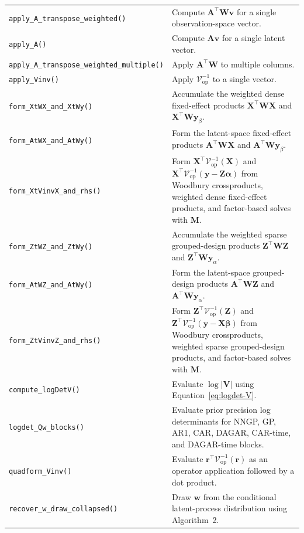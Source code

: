 \documentclass[11pt]{article}
\newcommand{\by}{\bm{y}}
\newcommand{\bw}{\bm{w}}
\newcommand{\balpha}{\bm{\alpha}}
\newcommand{\bbeta}{\bm{\beta}}
\newcommand{\br}{\bm{r}}
\newcommand{\bv}{\bm{v}}
\newcommand{\bA}{\bm{A}}
\newcommand{\bM}{\bm{M}}
\newcommand{\bV}{\bm{V}}
\newcommand{\bW}{\bm{W}}
\newcommand{\bX}{\bm{X}}
\newcommand{\bZ}{\bm{Z}}
\newcommand{\trans}{^\top}
\begin{document}
\begin{longtable}{p{}p{}}
\texttt{apply\_A\_transpose\_weighted()} &
  Compute $\bA\trans \bW\bv$ for a single observation-space vector. \\
\texttt{apply\_A()} & Compute $\bA\bv$ for a single latent vector. \\
\texttt{apply\_A\_transpose\_weighted\_multiple()} & Apply $\bA\trans \bW$ to multiple columns. \\
\texttt{apply\_Vinv()} & Apply $\mathcal{V}^{-1}_{\mathrm{op}}$ to a single vector. \\
\texttt{form\_XtWX\_and\_XtWy()} &
  Accumulate the weighted dense fixed-effect products $\bX\trans\bW\bX$ and
  $\bX\trans\bW\by_\beta$. \\
\texttt{form\_AtWX\_and\_AtWy()} &
  Form the latent-space fixed-effect products $\bA\trans\bW\bX$ and
  $\bA\trans\bW\by_\beta$. \\
\texttt{form\_XtVinvX\_and\_rhs()} &
  Form $\bX\trans\mathcal{V}^{-1}_{\mathrm{op}}(\bX)$ and
  $\bX\trans\mathcal{V}^{-1}_{\mathrm{op}}(\by-\bZ\balpha)$ from Woodbury
  crossproducts, weighted dense fixed-effect products, and factor-based solves
  with $\bM$. \\
\texttt{form\_ZtWZ\_and\_ZtWy()} &
  Accumulate the weighted sparse grouped-design products $\bZ\trans\bW\bZ$ and
  $\bZ\trans\bW\by_\alpha$. \\
\texttt{form\_AtWZ\_and\_AtWy()} &
  Form the latent-space grouped-design products $\bA\trans\bW\bZ$ and
  $\bA\trans\bW\by_\alpha$. \\
\texttt{form\_ZtVinvZ\_and\_rhs()} &
  Form $\bZ\trans\mathcal{V}^{-1}_{\mathrm{op}}(\bZ)$ and
  $\bZ\trans\mathcal{V}^{-1}_{\mathrm{op}}(\by-\bX\bbeta)$ from Woodbury
  crossproducts, weighted sparse grouped-design products, and factor-based
  solves with $\bM$. \\
\texttt{compute\_logDetV()} & Evaluate $\log|\bV|$ using Equation~\eqref{eq:logdet-V}. \\
\texttt{logdet\_Qw\_blocks()} &
  Evaluate prior precision log determinants for NNGP, GP, AR1, CAR, DAGAR,
  CAR-time, and DAGAR-time blocks. \\
\texttt{quadform\_Vinv()} & Evaluate $\br\trans\mathcal{V}^{-1}_{\mathrm{op}}(\br)$ as an operator application followed by a dot product. \\
\texttt{recover\_w\_draw\_collapsed()} & Draw $\bw$ from the conditional latent-process distribution using Algorithm~2. \\
\bottomrule
\end{longtable}




\clearpage
\printindex
\end{document}
